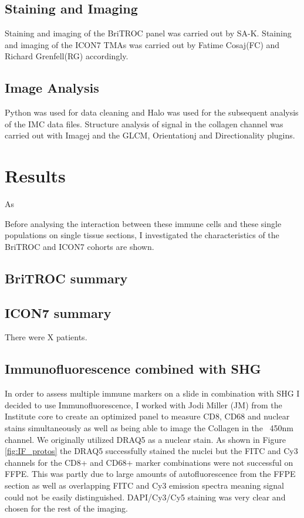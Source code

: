 \subsection{Staining and Imaging}
Staining and imaging of the BriTROC panel was carried out by SA-K. Staining and imaging of the ICON7 TMAs was carried out by Fatime Cosaj(FC) and Richard Grenfell(RG) accordingly.

\subsection{Image Analysis}
Python was used for data cleaning and Halo was used for the subsequent analysis of the IMC data files. Structure analysis of signal in the collagen channel was carried out with Imagej and the GLCM, Orientationj and Directionality plugins. 


\section{Results}

As

Before analysing the interaction between these immune cells and these single populations on single tissue sections, I investigated the characteristics of the BriTROC and ICON7 cohorts are shown.

\subsection{BriTROC summary}
\subsection{ICON7 summary}
There were X patients.


\subsection{Immunofluorescence combined with SHG}
In order to assess multiple immune markers on a slide in combination with SHG I decided to use Immunofluorescence, I worked with Jodi Miller (JM) from the Institute core to create an optimized panel to measure CD8, CD68 and nuclear stains simultaneously as well as being able to image the Collagen in the ~450nm channel. We originally utilized DRAQ5 as a nuclear stain. As shown in Figure \ref{fig:IF_protos} the DRAQ5 successfully stained the nuclei but the FITC and Cy3 channels for the CD8+ and CD68+ marker combinations were not successful on FFPE. This was partly due to large amounts of autofluorescence from the FFPE section as well as overlapping FITC and Cy3 emission spectra meaning signal could not be easily distinguished. DAPI/Cy3/Cy5 staining was very clear and chosen for the rest of the imaging.


